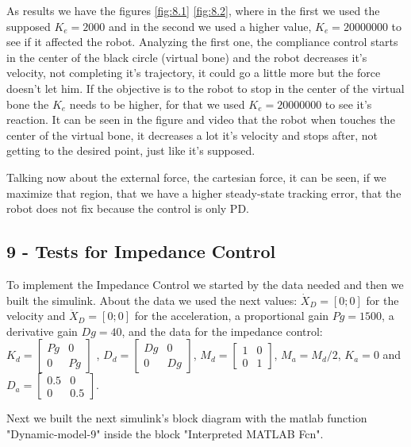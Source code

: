 As results we have the figures \eqref{fig:8.1} \eqref{fig:8.2}, where in the first we used the supposed $K_e=2000$ and in the second we used a higher value, $K_e=20000000$ to see if it affected the robot. Analyzing the first one, the compliance control starts in the center of the black circle (virtual bone) and the robot decreases it's velocity, not completing it's trajectory, it could go a little more but the force doesn't let him. If the objective is to the robot to stop in the center of the virtual bone the $K_e$ needs to be higher, for that we used $K_e=20000000$ to see it's reaction. It can be seen in the figure and video that the robot when touches the center of the virtual bone, it decreases a lot it's velocity and stops after, not getting to the desired point, just like it's supposed. 

Talking now about the external force, the cartesian force, it can be seen, if we maximize that region, that we have a higher steady-state tracking error, that the robot does not fix because the control is only PD.

\subsection{9 - Tests for Impedance Control}

To implement the Impedance Control we started by the data needed and then we built the simulink. About the data we used the next values: $\dot{X}_D = [0;0]$ for the velocity and $\ddot{X}_D = [0;0]$ for the acceleration, a proportional gain $Pg = 1500$, a derivative gain $Dg = 40$, and the data for the impedance control: $K_d = \begin{bmatrix}
Pg & 0\\
0 & Pg
\end{bmatrix}$ , $D_d = \begin{bmatrix}
Dg & 0 \\
0 & Dg
\end{bmatrix}$, $M_d = \begin{bmatrix}
1 & 0\\
0 & 1
\end{bmatrix}$, $M_a = M_d/2$, $K_a = 0$ and $D_a = \begin{bmatrix}
0.5 & 0\\
0 & 0.5
\end{bmatrix}$.

Next we built the next simulink's block diagram with the matlab function "Dynamic-model-9" inside the block "Interpreted MATLAB Fcn".

